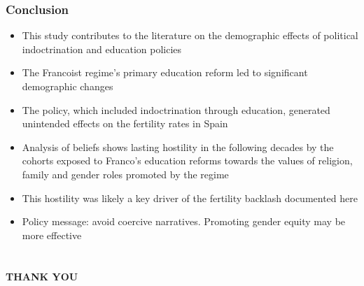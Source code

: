 \documentclass[aspectratio=169]{beamer}
\begin{document}
\begin{frame}
\frametitle{Conclusion}
\begin{itemize}
\item This study contributes to the  literature on the demographic effects of political indoctrination and education policies
\medskip

    \item The Francoist regime's primary education reform led to significant demographic changes
    \medskip

\item The policy, which included indoctrination through education, generated unintended effects on the fertility rates in Spain
\medskip

\item Analysis of beliefs shows lasting hostility in the following decades by the cohorts exposed to Franco's education reforms towards the values of religion, family and gender roles promoted by the regime
\medskip

\item This hostility was likely a key driver of the fertility backlash documented here
\item Policy message: avoid coercive narratives. Promoting gender equity may be more effective
\end{itemize}
\end{frame}
\section*{}
 \begin{frame}
\begin{center}
\textbf{{\LARGE THANK YOU}}\\

\vspace{2cm}
\thispagestyle{empty}
\addtocounter{framenumber}{-1} %
\end{center}
\end{frame}

\end{document}
